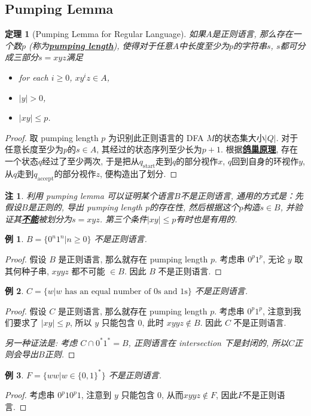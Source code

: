\documentclass[8pt]{article}
\theoremstyle{compact}
\newtheorem{theorem}{定理}[section]
\newtheorem{example}{例}[section]
\newtheorem{remark}{注}[section]
\def\obj#1{\textbf{\uline{#1}}}
\def\le{\leqslant}
\def\ge{\geqslant}
\begin{document}
\subsection{Pumping Lemma}
\begin{theorem}[Pumping Lemma for Regular Language]
	如果$A$是正则语言, 那么存在一个数$p$ (称为\obj{pumping length}), 使得对于任意$A$中长度至少为$p$的字符串$s$, $s$都可分成三部分$s = xyz$满足
	\begin{itemize}
		\item for each $i \ge 0$, $xy^iz \in A$,
		\item $|y| > 0$,
		\item $|xy| \le p$.
	\end{itemize}
\end{theorem}
\begin{proof}
	取 pumping length $p$ 为识别此正则语言的 DFA $M$的状态集大小$|Q|$. 对于任意长度至少为$p$的$s \in A$, 其经过的状态序列至少长为$p+1$. 根据\obj{鸽巢原理}, 存在一个状态$q$经过了至少两次, 于是把从$q_{\text{start}}$走到$q$的部分视作$x$, $q$回到自身的环视作$y$, 从$q$走到$q_{\text{accept}}$的部分视作$z$, 便构造出了划分. 
\end{proof}
\begin{remark}
	利用 pumping lemma 可以证明某个语言$B$不是正则语言, 通用的方式是：先假设$B$是正则的, 导出 pumping length $p$的存在性, 然后根据这个$p$构造$s \in B$, 并验证其\obj{不能}被划分为$s = xyz$. 第三个条件$|xy| \le p$有时也是有用的. 
\end{remark}
\begin{example}
	$B = \{0^n1^n | n \ge 0\}$ 不是正则语言.
\end{example}
\begin{proof}
	假设 $B$ 是正则语言, 那么就存在 pumping length $p$. 考虑串 $0^p1^p$, 无论 $y$ 取其何种子串, $xyyz$ 都不可能 $\in B$. 因此 $B$ 不是正则语言.
\end{proof}
\begin{example}
	$C = \{w | w \text{ has an equal number of 0s and 1s}\}$ 不是正则语言.
\end{example}
\begin{proof}
	假设 $C$ 是正则语言, 那么就存在 pumping length $p$. 考虑串 $0^p1^p$, 注意到我们要求了 $|xy| \le p$, 所以 $y$ 只能包含 $0$, 此时 $xyyz \notin B$. 因此 $C$ 不是正则语言.
	
	\textit{另一种证法是: 考虑 $C \cap 0^*1^* = B$, 正则语言在 intersection 下是封闭的, 所以$C$正则会导出$B$正则.}
\end{proof}
\begin{example}
	$F = \{ww | w \in \{0, 1\}^*\}$ 不是正则语言.
\end{example}
\begin{proof}
	考虑串 $0^p10^p1$, 注意到 $y$ 只能包含 $0$, 从而$xyyz \notin F$, 因此$F$不是正则语言.
\end{proof}
\end{document}
